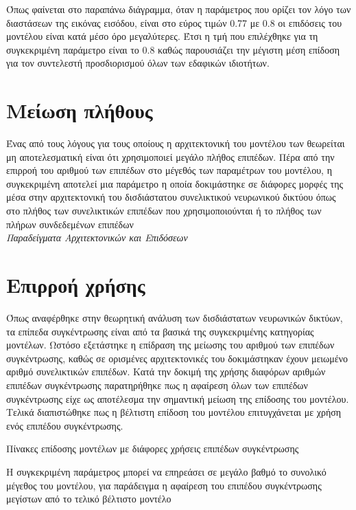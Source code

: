 Όπως φαίνεται στο παραπάνω διάγραμμα, όταν η παράμετρος που ορίζει τον λόγο των διαστάσεων της εικόνας εισόδου, είναι στο εύρος τιμών 0.77 με 0.8 οι επιδόσεις του μοντέλου είναι κατά μέσο όρο μεγαλύτερες. Έτσι η τμή που επιλέχθηκε για τη συγκεκριμένη παράμετρο είναι το 0.8 καθώς παρουσιάζει την μέγιστη μέση επίδοση για τον συντελεστή προσδιορισμού όλων των εδαφικών ιδιοτήτων.

\section{Μείωση πλήθους }
Ένας από τους λόγους για τους οποίους η αρχιτεκτονική του μοντέλου των  θεωρείται μη αποτελεσματική είναι ότι χρησιμοποιεί μεγάλο πλήθος επιπέδων. Πέρα από την επιρροή του αριθμού των επιπέδων στο μέγεθός των παραμέτρων του μοντέλου, η συγκεκριμένη αποτελεί μια παράμετρο η οποία δοκιμάστηκε σε διάφορες μορφές της μέσα στην αρχιτεκτονική του δισδιάστατου συνελικτικού νευρωνικού δικτύου όπως στο πλήθος των συνελικτικών επιπέδων που χρησιμοποιούνται ή το πλήθος των πλήρων συνδεδεμένων επιπέδων\\

\textit{Παραδείγματα Αρχιτεκτονικών και Επιδόσεων}\\



\section{Επιρροή χρήσης }
Όπως αναφέρθηκε στην θεωρητική ανάλυση των δισδιάστατων νευρωνικών δικτύων, τα επίπεδα συγκέντρωσης είναι από τα βασικά της συγκεκριμένης κατηγορίας μοντέλων. Ωστόσο εξετάστηκε η επίδραση της μείωσης του αριθμού των επιπέδων συγκέντρωσης, καθώς σε ορισμένες αρχιτεκτονικές του δοκιμάστηκαν έχουν μειωμένο αριθμό συνελικτικών επιπέδων. Κατά την δοκιμή της χρήσης διαφόρων αριθμών επιπέδων συγκέντρωσης παρατηρήθηκε πως η αφαίρεση όλων των επιπέδων συγκέντρωσης είχε ως αποτέλεσμα την σημαντική μείωση της επίδοσης του μοντέλου. Τελικά διαπιστώθηκε πως η βέλτιστη επίδοση του μοντέλου επιτυγχάνεται με χρήση ενός επιπέδου συγκέντρωσης.

Πίνακες επίδοσης μοντέλων με διάφορες χρήσεις επιπέδων συγκέντρωσης

Η συγκεκριμένη παράμετρος μπορεί να επηρεάσει σε μεγάλο βαθμό το συνολικό μέγεθος του μοντέλου, για παράδειγμα η αφαίρεση του επιπέδου συγκέντρωσης μεγίστων από το τελικό βέλτιστο μοντέλο

